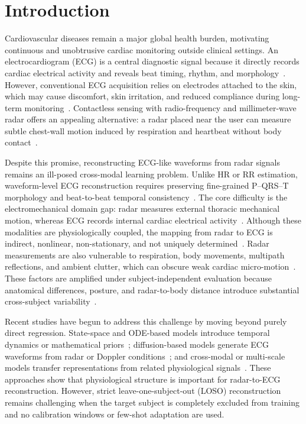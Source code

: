 \documentclass[runningheads]{llncs}
\begin{document}
\section{Introduction}

Cardiovascular diseases remain a major global health burden, motivating continuous and unobtrusive cardiac monitoring outside clinical settings. An electrocardiogram (ECG) is a central diagnostic signal because it directly records cardiac electrical activity and reveals beat timing, rhythm, and morphology~\cite{kouhalvandi2025advances,zhang2023overview}. However, conventional ECG acquisition relies on electrodes attached to the skin, which may cause discomfort, skin irritation, and reduced compliance during long-term monitoring~\cite{wuNonintrusiveHumanVital2024}. Contactless sensing with radio-frequency and millimeter-wave radar offers an appealing alternative: a radar placed near the user can measure subtle chest-wall motion induced by respiration and heartbeat without body contact~\cite{wuNonintrusiveHumanVital2024,hassanpourContactlessVitalSign2025a,noceraMachineLearningRADARbased2024}.

Despite this promise, reconstructing ECG-like waveforms from radar signals remains an ill-posed cross-modal learning problem. Unlike HR or RR estimation, waveform-level ECG reconstruction requires preserving fine-grained P--QRS--T morphology and beat-to-beat temporal consistency~\cite{radar2ecg}. The core difficulty is the electromechanical domain gap: radar measures external thoracic mechanical motion, whereas ECG records internal cardiac electrical activity~\cite{chenmmwave,airecg}. Although these modalities are physiologically coupled, the mapping from radar to ECG is indirect, nonlinear, non-stationary, and not uniquely determined~\cite{radarode,disentangled}. Radar measurements are also vulnerable to respiration, body movements, multipath reflections, and ambient clutter, which can obscure weak cardiac micro-motion~\cite{liComprehensiveSurveyContactless2025,noceraMachineLearningRADARbased2024,singhMultiResidentNonContactVital2021,hassanpourContactlessVitalSign2025a}. These factors are amplified under subject-independent evaluation because anatomical differences, posture, and radar-to-body distance introduce substantial cross-subject variability~\cite{radarode,radar2ecg,airecg,chenmmwave}.

Recent studies have begun to address this challenge by moving beyond purely direct regression. State-space and ODE-based models introduce temporal dynamics or mathematical priors~\cite{11322590,radarode,radarodemt}; diffusion-based models generate ECG waveforms from radar or Doppler conditions~\cite{airecg,ecgdiff,FromRadarCardiography}; and cross-modal or multi-scale models transfer representations from related physiological signals~\cite{disentangled,radar2ecg,cross-modalautoencoder}. These approaches show that physiological structure is important for radar-to-ECG reconstruction. However, strict leave-one-subject-out (LOSO) reconstruction remains challenging when the target subject is completely excluded from training and no calibration windows or few-shot adaptation are used.
\end{document}
